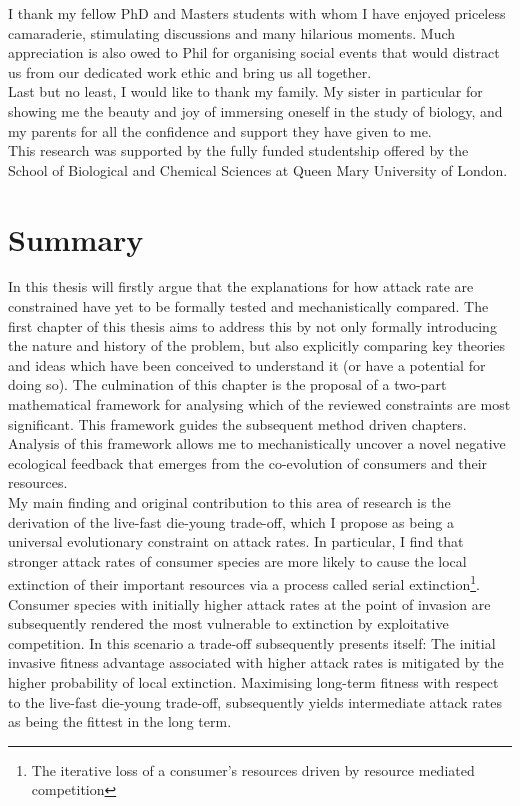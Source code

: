 \documentclass[a4paper]{report}
\begin{document}
 I thank my fellow PhD and Masters students with whom I have enjoyed priceless camaraderie, stimulating discussions and many hilarious moments. Much appreciation is also owed to Phil for organising social events that would distract us from our dedicated work ethic and bring us all together.\\

Last but no least, I would like to thank my family. My sister in particular for showing me the beauty and joy of immersing oneself in the study of biology, and my parents for all the confidence and support they have given to me.\\

This research was supported by the fully funded studentship offered by the School of Biological and Chemical Sciences at Queen Mary University of London.

\newpage

\section*{Summary}

In this thesis will firstly argue that the explanations for how attack rate are constrained have yet to be formally tested and mechanistically compared. The first chapter of this thesis aims to address this by not only formally introducing the nature and history of the problem, but also explicitly comparing key theories and ideas which have been conceived to understand it (or have a potential for doing so). The culmination of this chapter is the proposal of a two-part mathematical framework for analysing which of the reviewed constraints are most significant. This framework guides the subsequent method driven chapters. Analysis of this framework allows me to mechanistically uncover a novel negative ecological feedback that emerges from the co-evolution of consumers and their resources. \\

 My main finding and original contribution to this area of research is the derivation of the live-fast die-young trade-off, which I propose as being a universal evolutionary constraint on attack rates. In particular, I find that stronger attack rates of consumer species are more likely to cause the local extinction of their important resources via a process called serial extinction\footnote{The iterative loss of a consumer's resources driven by resource mediated competition}. Consumer species with initially higher attack rates at the point of invasion are subsequently rendered the most vulnerable to extinction by exploitative competition. In this scenario a trade-off subsequently presents itself: The initial invasive fitness advantage associated with higher attack rates is mitigated by the higher probability of local extinction. Maximising long-term fitness with respect to the live-fast die-young trade-off, subsequently yields intermediate attack rates as being the fittest in the long term. \\
 
\end{document}
